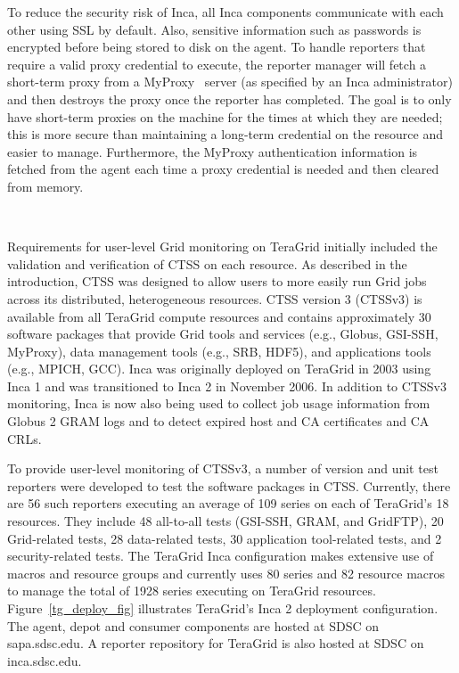 \documentclass[times,10pt,twocolumn]{article}
\begin{document}
\label{security}

To reduce the security risk of Inca, all Inca components communicate with each
other using SSL by default.  Also, sensitive information such as passwords is
encrypted before being stored to disk on the agent.  To handle reporters that
require a valid proxy credential to execute, the reporter manager will fetch a
short-term proxy from a MyProxy~\cite{myproxy} server (as specified by an Inca
administrator) and then destroys the proxy once the reporter has completed.
The goal is to only have short-term proxies on the machine for the times at
which they are needed; this is more secure than maintaining a long-term
credential on the resource and easier to manage.  Furthermore, the MyProxy
authentication information is fetched from the agent each time a proxy
credential is needed and then cleared from memory.


~\newpage

\label{usecases}


Requirements for user-level Grid monitoring on TeraGrid initially included the
validation and verification of CTSS on each resource.  As described in the
introduction, CTSS was designed to
allow users to more easily run Grid jobs across its distributed, heterogeneous
resources.  CTSS version 3 (CTSSv3) is available from all TeraGrid compute
resources and contains approximately 30 software packages that provide
Grid tools and services (e.g., Globus, GSI-SSH, MyProxy), data management
tools (e.g., SRB, HDF5), and applications tools (e.g., MPICH, GCC).
Inca was originally
deployed on TeraGrid in 2003 using Inca 1 and was transitioned to Inca 2 in
November 2006.  In addition to CTSSv3 monitoring, Inca is now also being used
to collect job usage information from Globus 2 GRAM logs and to detect expired
host and CA certificates and CA CRLs. 

To provide user-level monitoring of CTSSv3, a number of version and unit
test reporters were developed to test the software packages in CTSS.
Currently, there are 56 such reporters executing an average of 109 series on
each of TeraGrid's 18 resources.  They include 48 all-to-all tests (GSI-SSH,
GRAM, and GridFTP), 20 Grid-related tests, 28 data-related tests, 30
application tool-related tests, and 2 security-related tests.  The TeraGrid
Inca configuration makes extensive use of macros and resource groups and
currently uses 80 series and 82 resource macros to manage the total of 1928
series executing on TeraGrid resources.
Figure~\ref{tg_deploy_fig} illustrates TeraGrid's Inca 2 deployment
configuration.  The
agent, depot and consumer components are hosted at SDSC on 
sapa.sdsc.edu.  A reporter repository for TeraGrid is also hosted
at SDSC on inca.sdsc.edu.  
\end{document}
